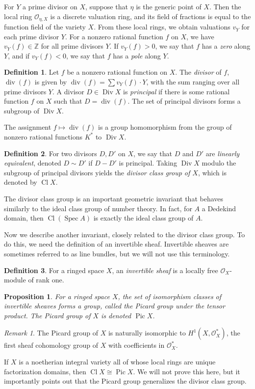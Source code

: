 \documentclass[12pt,twoside]{reedthesis}
\theoremstyle{plain}
\newtheorem{proposition}[theorem]{Proposition}
\theoremstyle{definition}
\newtheorem{definition}{Definition}[section]
\theoremstyle{remark}
\newtheorem{remark}{Remark}[section]
\newcommand{\ZZ}{\mathbb{Z}}
\newcommand{\calO}{\mathcal{O}}
\newcommand{\Div}{\operatorname{Div}}
\newcommand{\Cl}{\operatorname{Cl}}
\newcommand{\Spec}{\operatorname{Spec}}
\newcommand{\Pic}{\operatorname{Pic}}
\renewcommand{\div}{\operatorname{div}}
\begin{document}
For $Y$ a prime divisor on $X$, suppose that $\eta$ is the generic point of $X$. Then the local ring $\calO_{\eta, X}$ is a discrete valuation ring, and its field of fractions is equal to the function field of the variety $X$. From these local rings, we obtain valuations $v_Y$ for each prime divisor $Y$. For a nonzero  rational function $f$ on $X$, we have $v_Y(f)\in\ZZ$ for all prime divisors $Y$. If $v_Y(f)>0$, we say that $f$ has a \emph{zero} along $Y$, and if $v_Y(f)<0$, we say that $f$ has a \emph{pole} along $Y$.

\begin{definition}
Let $f$ be a nonzero rational function on $X$. The \emph{divisor} of $f$, $\div(f)$ is given by $\div(f)=\sum v_Y(f)\cdot Y$, with the sum ranging over all prime divisors $Y$. A divisor $D\in\Div X$ is \emph{principal} if there is some rational function $f$ on $X$ such that $D=\div(f)$. The set of principal divisors forms a subgroup of $\Div X$.
\end{definition}

\noindent The assignment $f\mapsto\div(f)$ is a group homomorphism from the group of nonzero rational functions $K^*$ to $\Div X$. 

\begin{definition}
For two divisors $D,D'$ on $X$, we say that $D$ and $D'$ are \emph{linearly equivalent}, denoted $D\sim D'$ if $D-D'$ is principal. Taking $\Div X$ modulo the subgroup of principal divisors yields the \emph{divisor class group of $X$}, which is denoted by $\Cl X$.
\end{definition}

The divisor class group is an important geometric invariant that behaves similarly to the ideal class group of number theory. In fact, for $A$ a Dedekind domain, then $\Cl(\Spec A)$ is exactly the ideal class group of $A$. 

Now we describe another invariant, closely related to the divisor class group. To do this, we need the definition of an invertible sheaf. Invertible sheaves are sometimes referred to as line bundles, but we will not use this terminology.
\begin{definition}
For a ringed space $X$, an \emph{invertible sheaf} is a locally free $\calO_X$-module of rank one.
\end{definition}
\begin{proposition}
For a ringed space $X$, the set of isomorphism classes of invertible sheaves forms a group, called the \emph{Picard group} under the tensor product. The Picard group of $X$ is denoted $\Pic X$.
\end{proposition}
\begin{remark}
The Picard group of $X$ is naturally isomorphic to $H^1(X,\calO_X^*)$, the first sheaf cohomology group of $X$ with coefficients in $\calO_X^*$.
\end{remark}
\noindent If $X$ is a noetherian integral variety all of whose local rings are unique factorization domains, then $\Cl X\cong \Pic X$. We will not prove this here, but it importantly points out that the Picard group generalizes the divisor class group.
\end{document}
